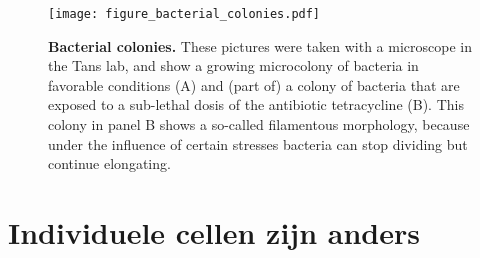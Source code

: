 \begin{figure}
    \begin{minipage}[c]{0.5\textwidth}
        \texttt{[image: figure\_bacterial\_colonies.pdf]}
    \end{minipage}\hfill
    \begin{minipage}[c]{0.5\textwidth}
        \caption{ 
            \textbf{Bacterial colonies.}
            These pictures were taken with a microscope in the Tans lab, and show a growing microcolony of bacteria in favorable conditions (A) and (part of) a colony of bacteria that are exposed to a sub-lethal dosis of the antibiotic tetracycline (B). This colony in panel B shows a so-called filamentous morphology, because under the influence of certain stresses bacteria can stop dividing but continue elongating. 
        }
        \label{fig:intro:bacs}
    \end{minipage}
\end{figure}


\section*{Individuele cellen zijn anders}

